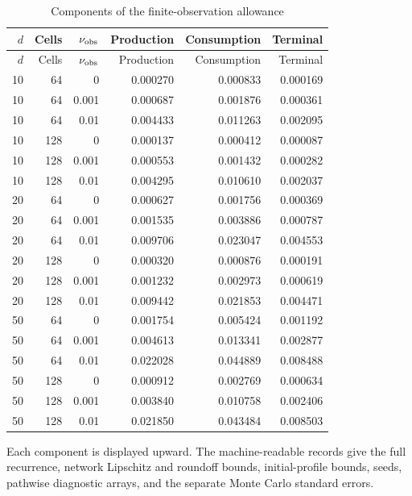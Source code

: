 \begingroup\small\setlength{\tabcolsep}{4pt}
\begin{longtable}{rrrrrr}
\caption{Components of the finite-observation allowance}\label{tab:r14sensingaccounts}\\
\toprule
$d$ & Cells & $\nu_{\rm obs}$ & Production & Consumption & Terminal\\\midrule
\endfirsthead
\toprule
$d$ & Cells & $\nu_{\rm obs}$ & Production & Consumption & Terminal\\\midrule
\endhead
10 & 64 & 0 & 0.000270 & 0.000833 & 0.000169\\
10 & 64 & 0.001 & 0.000687 & 0.001876 & 0.000361\\
10 & 64 & 0.01 & 0.004433 & 0.011263 & 0.002095\\
10 & 128 & 0 & 0.000137 & 0.000412 & 0.000087\\
10 & 128 & 0.001 & 0.000553 & 0.001432 & 0.000282\\
10 & 128 & 0.01 & 0.004295 & 0.010610 & 0.002037\\
20 & 64 & 0 & 0.000627 & 0.001756 & 0.000369\\
20 & 64 & 0.001 & 0.001535 & 0.003886 & 0.000787\\
20 & 64 & 0.01 & 0.009706 & 0.023047 & 0.004553\\
20 & 128 & 0 & 0.000320 & 0.000876 & 0.000191\\
20 & 128 & 0.001 & 0.001232 & 0.002973 & 0.000619\\
20 & 128 & 0.01 & 0.009442 & 0.021853 & 0.004471\\
50 & 64 & 0 & 0.001754 & 0.005424 & 0.001192\\
50 & 64 & 0.001 & 0.004613 & 0.013341 & 0.002877\\
50 & 64 & 0.01 & 0.022028 & 0.044889 & 0.008488\\
50 & 128 & 0 & 0.000912 & 0.002769 & 0.000634\\
50 & 128 & 0.001 & 0.003840 & 0.010758 & 0.002406\\
50 & 128 & 0.01 & 0.021850 & 0.043484 & 0.008503\\
\bottomrule
\end{longtable}
\noindent Each component is displayed upward. The machine-readable records give the full recurrence, network Lipschitz and roundoff bounds, initial-profile bounds, seeds, pathwise diagnostic arrays, and the separate Monte Carlo standard errors.
\endgroup
